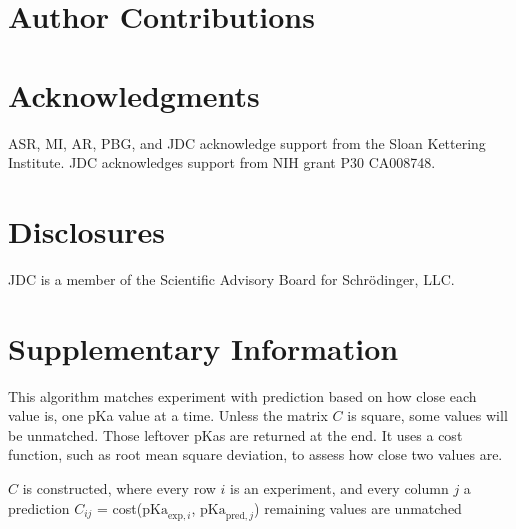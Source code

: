 \documentclass[9pt,lineno]{elife}
\newcommand{\pKa}{\mathrm{pKa}}
\begin{document}
\section{Author Contributions}


\section{Acknowledgments}

ASR, MI, AR, PBG, and JDC acknowledge support from the Sloan Kettering Institute.
JDC acknowledges support from NIH grant P30 CA008748.

\section{Disclosures}

JDC is a member of the Scientific Advisory Board for Schr\"{o}dinger, LLC.

\nocite{*} %




\appendix

\section{Supplementary Information}





\begin{algorithm}[H]
\SetAlgoLined
\caption{This algorithm matches experiment with prediction based on how close each value is, one pKa value at a time. Unless the matrix $C$ is square, some values will be unmatched. Those leftover pKas are returned at the end. It uses a cost function, such as root mean square deviation, to assess how close two values are.}
\label{alg:closest}
 
 $C$ is constructed, where every row  $i$ is an experiment, and every column $j$ a prediction\;
 $C_{ij}$ = cost($\pKa_{\text{exp},i}$, $\pKa_{\text{pred},j}$)\;
 remaining values are unmatched\;
\end{algorithm}
\end{document}
